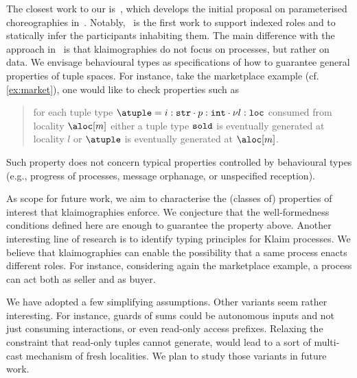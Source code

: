The closest work to our is~\cite{chjny19}, which develops the initial
proposal on parameterised choreographies in~\cite{ydbh10,dybh12}.
%
Notably,~\cite{chjny19} is the first work to support indexed roles and
to statically infer the participants inhabiting them.
%
The main difference with the approach in~\cite{chjny19} is that
klaimographies do not focus on processes, but rather on data.
%
We envisage behavioural types as specifications of how to guarantee
general properties of tuple spaces.
%
For instance, take the marketplace example (cf. \cref{ex:market}),
one would like to check properties such as
\begin{quote}
  for each tuple type
  $\atuple = {{i : \asort[str]} \cdot {p : \asort[int]} \cdot {\nu l :
      \asort[loc]}}$ consumed from locality $\aloc[m]$ either a tuple type
  $\asort[sold]$ is eventually generated at locality $l$ or $\atuple$
  is eventually generated at $\aloc[m]$.
\end{quote}
%
Such property does not concern typical properties
controlled by behavioural types (e.g., progress of processes, message
orphanage, or unspecified reception).

As scope for future work, we aim to characterise the (classes of)
properties of interest that klaimographies enforce.
%
We conjecture that the well-formedness conditions defined here
are enough to guarantee the property above.
%
Another interesting line of research is to identify typing principles
for Klaim processes.
%
We believe that klaimographies can enable the possibility that a same
process enacts different roles.
%
For instance, considering again the marketplace example, a process
can act both as seller and as buyer.

We have adopted a few simplifying assumptions.
%
Other variants seem rather interesting.
%
For instance, guards of sums could be autonomous inputs and not just
consuming interactions, or even read-only access prefixes.
%
Relaxing the constraint that read-only tuples cannot generate, would
lead to a sort of multi-cast mechanism of fresh localities.
%
We plan to study those variants in future work.


